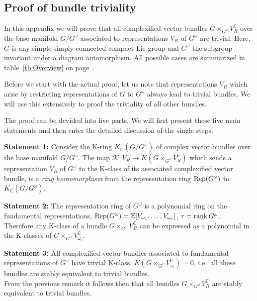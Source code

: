 \documentclass[12pt,a4paper]{article}
\newcommand{\Complex}{\mathbb{C}}
\newcommand{\Integer}{\mathbb{Z}}
\newcommand{\mc}{\mathcal} %
\def\iG{G^\omega} %
\def\rank{{\rm rank\,}}
\begin{document}
\begin{appendix}

\section{Proof of bundle triviality}
In this appendix we will prove that all complexified vector bundles
$G\times_{\iG} V_{R}^{\Complex } $ over the base manifold $G/\iG $ associated
to representations $V_{R}$ of $\iG $ are trivial. Here, $G$ is any
simple simply-connected compact Lie group and $\iG $ the subgroup invariant
under a diagram automorphism. All possible cases are summarized in
table~\ref{tb:Overview} on page~\pageref{tb:Overview}.
\smallskip 

Before we start with the actual proof, let us note that 
representations $V_{R}$ which arise by restricting  
representations of $G$ to $\iG $ always lead to trivial bundles. We
will use this extensively to proof the triviality of all other
bundles.
\smallskip

The proof can be devided into five parts. We will first present these 
five main statements and then enter the detailed discussion of the 
single steps.
\bigskip 

\noindent
{\bf Statement 1:} Consider the K-ring $K_{\Complex } (G/\iG )$ of complex 
vector bundles over the base manifold $G/\iG $. The map $\mc{K}:V_{R}\to K 
(G\times_{\iG} V_{R}^{\Complex })$ which sends a representation $V_{R}$ of 
$\iG $ to the K-class of its associated complexified vector bundle, is a 
\textit{ring homomorphism} from the representation ring ${\rm Rep} (\iG )$ 
to $K_{\Complex } (G/\iG )$.
\bigskip

\noindent
{\bf Statement 2:} The representation ring of $\iG $ is a polynomial ring 
on the fundamental representations, ${\rm Rep} (\iG)=\Integer [V_{\omega 
_{1}},\dots ,V_{\omega _{r}}]$, $r=\rank \iG $.\\
Therefore any K-class of a bundle $G\times_{\iG} V_{R}^{\Complex } $ can be
expressed as a polynomial in the K-classes of $G\times_{\iG } 
V_{\omega_{i}}^{\Complex } $.
\bigskip 

\noindent
{\bf Statement 3:} All complexified vector bundles associated to
fundamental representations of $\iG $ have trivial K-class, $K
(G\times_{\iG} V_{\omega _{i}}^{\Complex })=0$, i.e.\ all these 
bundles are stably equivalent to trivial bundles.\\
From the previous remark it follows then that all bundles $G
\times_{\iG} V_{R}^{\Complex } $ are stably equivalent to trivial 
bundles.
\bigskip


\end{appendix}
\end{document}
